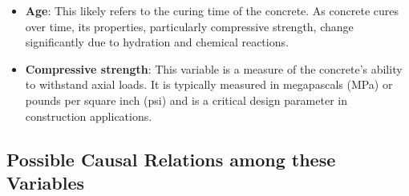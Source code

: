 \documentclass{article}
\begin{document}
\begin{itemize}
    \item \textbf{Age}: This likely refers to the curing time of the concrete. As concrete cures over time, its properties, particularly compressive strength, change significantly due to hydration and chemical reactions.
    
    \item \textbf{Compressive strength}: This variable is a measure of the concrete's ability to withstand axial loads. It is typically measured in megapascals (MPa) or pounds per square inch (psi) and is a critical design parameter in construction applications.
\end{itemize}

\subsection{Possible Causal Relations among these Variables}
\end{document}
